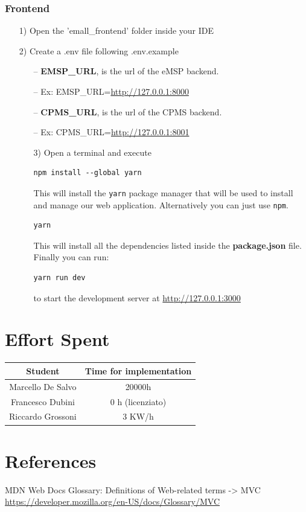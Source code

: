 \documentclass[table, 12pt]{article}
\begin{document}
\subsubsection{Frontend}
\begin{itemize}
    \item[1)] Open the 'emall\_frontend' folder inside your IDE
    \item[2)] Create a .env file following .env.example
    \begin{itemize}
        \item[--]   \textbf{EMSP\_URL}, is the url of the eMSP backend. 
        \item[--]   Ex: EMSP\_URL=\url{http://127.0.0.1:8000}
        \item[--]   \textbf{CPMS\_URL}, is the url of the CPMS backend.
        \item[--]   Ex: CPMS\_URL=\url{http://127.0.0.1:8001}
    \end{itemize}
    \begin{itemize}
        \item[3)] Open a terminal and execute
        \begin{lstlisting}[language=shell]
        npm install --global yarn
        \end{lstlisting}
        This will install the \texttt{yarn} package manager that will be used to install and manage our web application.
        Alternatively you can just use \texttt{npm}.
        \begin{lstlisting}[language=shell]
        yarn
        \end{lstlisting}
        This will install all the dependencies listed inside the \textbf{package.json} file.\\
        Finally you can run:
        \begin{lstlisting}[language=shell]
        yarn run dev
        \end{lstlisting}
        to start the development server at \url{http://127.0.0.1:3000}
    \end{itemize}
\end{itemize}

\newpage
\section{Effort Spent}
    \begin{tabular}{|c||c|}
        \hline
        Student & Time for implementation\\ \hline
        Marcello De Salvo & 20000h  \\
        Francesco Dubini & 0 h (licenziato) \\
        Riccardo Grossoni & 3 KW/h \\
        \hline
    \end{tabular}


\section{References}


\begin{thebibliography}{9}
    MDN Web Docs Glossary: Definitions of Web-related terms -> MVC
    \url{https://developer.mozilla.org/en-US/docs/Glossary/MVC}

    
\end{thebibliography}
\end{document}
